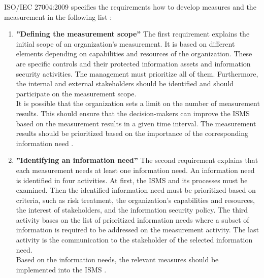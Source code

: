 ISO/IEC 27004:2009 specifies the requirements how to develop measures and the measurement in the following list \cite{ISO_27004_2009}:

\begin{enumerate}[label=(\alph*)]
  \item \label{itm:a} \textbf{''Defining the measurement scope''}
  The first requirement explains the initial scope of an organization's measurement. It is based on different elements depending on capabilities and resources of the organization. These are specific controls and their protected information assets and information security activities. The management must prioritize all of them. Furthermore, the internal and external stakeholders should be identified and should participate on the measurement scope. \\
  It is possible that the organization sets a limit on the number of measurement results. This should ensure that the decision-makers can improve the ISMS based on the measurement results in a given time interval. The measurement results should be prioritized based on the importance of the corresponding information need \cite{ISO_27004_2009}. \\

  \item \label{itm:b} \textbf{''Identifying an information need''}
  The second requirement explains that each measurement needs at least one information need. An information need is identified in four activities. At first, the ISMS and its processes must be examined. Then the identified information need must be prioritized based on criteria, such as risk treatment, the organization's capabilities and resources, the interest of stakeholders, and the information security policy. The third activity bases on the list of prioritized information needs where a subset of information is required to be addressed on the measurement activity. The last activity is the communication to the stakeholder of the selected information need. \\
  Based on the information needs, the relevant measures should be implemented into the ISMS \cite{ISO_27004_2009}. \\


\end{enumerate}
